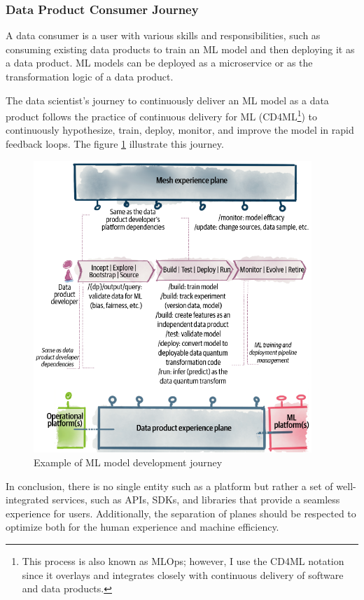 \documentclass[12pt, a4paper]{book}
\begin{document}
\subsubsection*{Data Product Consumer Journey}
A data consumer is a user with various skills and responsibilities, such as consuming existing data products to train an ML model and then deploying it as a data product. ML models can be deployed as a microservice or as the transformation logic of a data product.

The data scientist's journey to continuously deliver an ML model as a data product follows the practice of continuous delivery for ML (CD4ML\footnote{This process is also known as MLOps; however, I use the CD4ML notation since it overlays and integrates closely with continuous delivery of software and data products.}) to continuously hypothesize, train, deploy, monitor, and improve the model in rapid feedback loops. The figure \ref{MLJourney} illustrate this journey.

\begin{figure}[h]
	\vspace*{-.3cm}
	\begin{framed}
		\centering
		\includegraphics[width=10.5cm]{MLJourney.png}
		\caption{Example of ML model development journey}
		\label{MLJourney}
	\end{framed}
\end{figure}

In conclusion, there is no single entity such as a platform but rather a set of well-integrated services, such as APIs, SDKs, and libraries that provide a seamless experience for users. Additionally, the separation of planes should be respected to optimize both for the human experience and machine efficiency.
\end{document}
